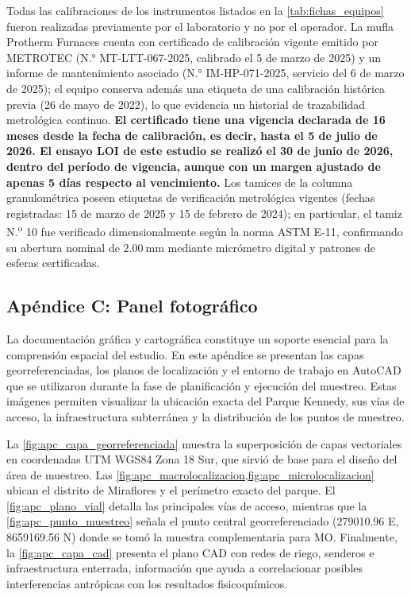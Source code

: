 \documentclass[fleqn]{jaes}
\begin{document}
Todas las calibraciones de los instrumentos listados en la \cref{tab:fichas_equipos} fueron realizadas previamente por el laboratorio y no por el operador. La mufla Protherm Furnaces cuenta con certificado de calibración vigente emitido por METROTEC (N.° MT-LTT-067-2025, calibrado el 5 de marzo de 2025) y un informe de mantenimiento asociado (N.° IM-HP-071-2025, servicio del 6 de marzo de 2025); el equipo conserva además una etiqueta de una calibración histórica previa (26 de mayo de 2022), lo que evidencia un historial de trazabilidad metrológica continuo. \textbf{El certificado tiene una vigencia declarada de 16 meses desde la fecha de calibración, es decir, hasta el 5 de julio de 2026. El ensayo LOI de este estudio se realizó el 30 de junio de 2026, dentro del período de vigencia, aunque con un margen ajustado de apenas 5 días respecto al vencimiento.} Los tamices de la columna granulométrica poseen etiquetas de verificación metrológica vigentes (fechas registradas: 15 de marzo de 2025 y 15 de febrero de 2024); en particular, el tamiz N.\textsuperscript{o} 10 fue verificado dimensionalmente según la norma ASTM E-11, confirmando su abertura nominal de $2.00~\text{mm}$ mediante micrómetro digital y patrones de esferas certificadas.

\subsection{Apéndice C: Panel fotográfico}
\label{sec:apendiceC}

La documentación gráfica y cartográfica constituye un soporte esencial para la comprensión espacial del estudio. En este apéndice se presentan las capas georreferenciadas, los planos de localización y el entorno de trabajo en AutoCAD que se utilizaron durante la fase de planificación y ejecución del muestreo. Estas imágenes permiten visualizar la ubicación exacta del Parque Kennedy, sus vías de acceso, la infraestructura subterránea y la distribución de los puntos de muestreo.

La \cref{fig:apc_capa_georreferenciada} muestra la superposición de capas vectoriales en coordenadas UTM WGS84 Zona 18 Sur, que sirvió de base para el diseño del área de muestreo. Las \cref{fig:apc_macrolocalizacion,fig:apc_microlocalizacion} ubican el distrito de Miraflores y el perímetro exacto del parque. El \cref{fig:apc_plano_vial} detalla las principales vías de acceso, mientras que la \cref{fig:apc_punto_muestreo} señala el punto central georreferenciado (279010.96 E, 8659169.56 N) donde se tomó la muestra complementaria para MO. Finalmente, la \cref{fig:apc_capa_cad} presenta el plano CAD con redes de riego, senderos e infraestructura enterrada, información que ayuda a correlacionar posibles interferencias antrópicas con los resultados fisicoquímicos.
\end{document}
